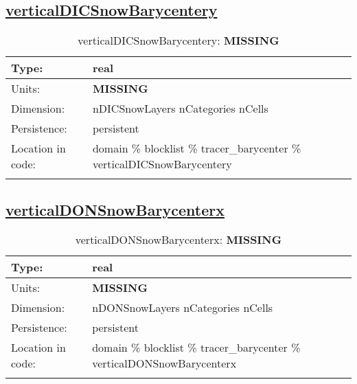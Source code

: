\subsection[verticalDICSnowBarycentery]{\hyperref[sec:var_tab_tracer_barycenter]{verticalDICSnowBarycentery}}
\label{subsec:var_sec_tracer_barycenter_verticalDICSnowBarycentery}
\begin{center}
\begin{longtable}{| p{2.0in} | p{4.0in} |}
        \hline 
        Type: & real \\
        \hline 
        Units: & {\bf \color{red} MISSING} \\
        \hline 
        Dimension: & nDICSnowLayers nCategories nCells \\
        \hline 
        Persistence: & persistent \\
        \hline 
         Location in code: & domain \% blocklist \% tracer\_barycenter \% verticalDICSnowBarycentery \\
         \hline 
    \caption{verticalDICSnowBarycentery: {\bf \color{red} MISSING}}
\end{longtable}
\end{center}
\subsection[verticalDONSnowBarycenterx]{\hyperref[sec:var_tab_tracer_barycenter]{verticalDONSnowBarycenterx}}
\label{subsec:var_sec_tracer_barycenter_verticalDONSnowBarycenterx}
\begin{center}
\begin{longtable}{| p{2.0in} | p{4.0in} |}
        \hline 
        Type: & real \\
        \hline 
        Units: & {\bf \color{red} MISSING} \\
        \hline 
        Dimension: & nDONSnowLayers nCategories nCells \\
        \hline 
        Persistence: & persistent \\
        \hline 
         Location in code: & domain \% blocklist \% tracer\_barycenter \% verticalDONSnowBarycenterx \\
         \hline 
    \caption{verticalDONSnowBarycenterx: {\bf \color{red} MISSING}}
\end{longtable}
\end{center}
